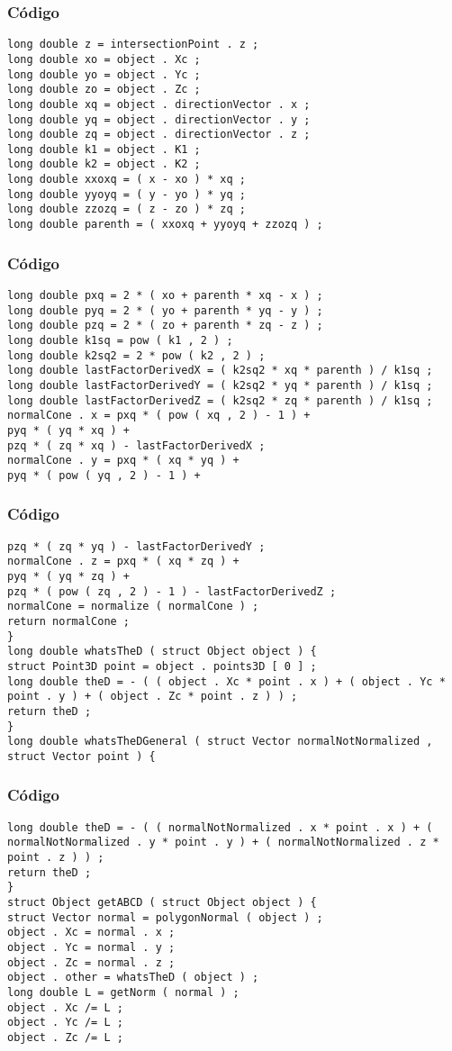 \documentclass{beamer}
\begin{document}
\begin{frame}[fragile]
\frametitle{C\'odigo}
\begin{verbatim}
long double z = intersectionPoint . z ; 
long double xo = object . Xc ; 
long double yo = object . Yc ; 
long double zo = object . Zc ; 
long double xq = object . directionVector . x ; 
long double yq = object . directionVector . y ; 
long double zq = object . directionVector . z ; 
long double k1 = object . K1 ; 
long double k2 = object . K2 ; 
long double xxoxq = ( x - xo ) * xq ; 
long double yyoyq = ( y - yo ) * yq ; 
long double zzozq = ( z - zo ) * zq ; 
long double parenth = ( xxoxq + yyoyq + zzozq ) ; 
\end{verbatim}
\end{frame}
\begin{frame}[fragile]
\frametitle{C\'odigo}
\begin{verbatim}
long double pxq = 2 * ( xo + parenth * xq - x ) ; 
long double pyq = 2 * ( yo + parenth * yq - y ) ; 
long double pzq = 2 * ( zo + parenth * zq - z ) ; 
long double k1sq = pow ( k1 , 2 ) ; 
long double k2sq2 = 2 * pow ( k2 , 2 ) ; 
long double lastFactorDerivedX = ( k2sq2 * xq * parenth ) / k1sq ; 
long double lastFactorDerivedY = ( k2sq2 * yq * parenth ) / k1sq ; 
long double lastFactorDerivedZ = ( k2sq2 * zq * parenth ) / k1sq ; 
normalCone . x = pxq * ( pow ( xq , 2 ) - 1 ) + 
pyq * ( yq * xq ) + 
pzq * ( zq * xq ) - lastFactorDerivedX ; 
normalCone . y = pxq * ( xq * yq ) + 
pyq * ( pow ( yq , 2 ) - 1 ) + 
\end{verbatim}
\end{frame}
\begin{frame}[fragile]
\frametitle{C\'odigo}
\begin{verbatim}
pzq * ( zq * yq ) - lastFactorDerivedY ; 
normalCone . z = pxq * ( xq * zq ) + 
pyq * ( yq * zq ) + 
pzq * ( pow ( zq , 2 ) - 1 ) - lastFactorDerivedZ ; 
normalCone = normalize ( normalCone ) ; 
return normalCone ; 
} 
long double whatsTheD ( struct Object object ) { 
struct Point3D point = object . points3D [ 0 ] ; 
long double theD = - ( ( object . Xc * point . x ) + ( object . Yc * point . y ) + ( object . Zc * point . z ) ) ; 
return theD ; 
} 
long double whatsTheDGeneral ( struct Vector normalNotNormalized , struct Vector point ) { 
\end{verbatim}
\end{frame}
\begin{frame}[fragile]
\frametitle{C\'odigo}
\begin{verbatim}
long double theD = - ( ( normalNotNormalized . x * point . x ) + ( normalNotNormalized . y * point . y ) + ( normalNotNormalized . z * point . z ) ) ; 
return theD ; 
} 
struct Object getABCD ( struct Object object ) { 
struct Vector normal = polygonNormal ( object ) ; 
object . Xc = normal . x ; 
object . Yc = normal . y ; 
object . Zc = normal . z ; 
object . other = whatsTheD ( object ) ; 
long double L = getNorm ( normal ) ; 
object . Xc /= L ; 
object . Yc /= L ; 
object . Zc /= L ; 
\end{verbatim}
\end{frame}
\end{document}
